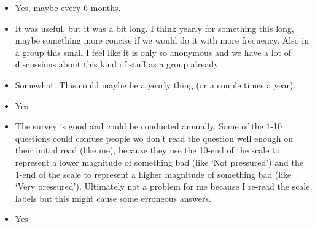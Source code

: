 \documentclass[
]{book}
\providecommand{\tightlist}{%
  \setlength{\itemsep}{0pt}\setlength{\parskip}{0pt}}
\begin{document}
\begin{itemize}
\tightlist
\item
  Yes, maybe every 6 months.
\item
  It was useful, but it was a bit long. I think yearly for something this long, maybe something more concise if we would do it with more frequency. Also in a group this small I feel like it is only so anonymous and we have a lot of discussions about this kind of stuff as a group already.\\
\item
  Somewhat. This could maybe be a yearly thing (or a couple times a year).
\item
  Yes
\item
  The survey is good and could be conducted annually. Some of the 1-10 questions could confuse people wo don't read the question well enough on their initial read (like me), because they use the 10-end of the scale to represent a lower magnitude of something bad (like `Not pressured') and the 1-end of the scale to represent a higher magnitude of something bad (like `Very pressured'). Ultimately not a problem for me because I re-read the scale labels but this might cause some erroneous answers.
\item
  Yes
\end{itemize}
\end{document}
